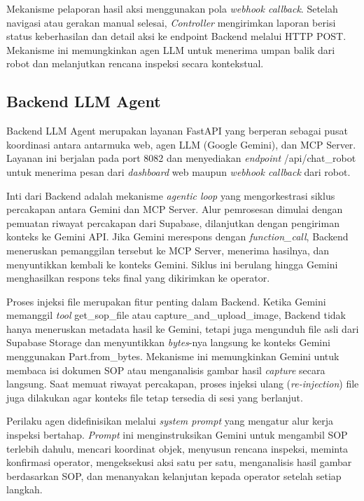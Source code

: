 Mekanisme pelaporan hasil aksi menggunakan pola \textit{webhook callback}. Setelah navigasi atau gerakan manual selesai, \textit{Controller} mengirimkan laporan berisi status keberhasilan dan detail aksi ke endpoint Backend melalui HTTP POST. Mekanisme ini memungkinkan agen LLM untuk menerima umpan balik dari robot dan melanjutkan rencana inspeksi secara kontekstual.

\subsection{Backend LLM Agent}

Backend LLM Agent merupakan layanan FastAPI yang berperan sebagai pusat koordinasi antara antarmuka web, agen LLM (Google Gemini), dan MCP Server. Layanan ini berjalan pada port 8082 dan menyediakan \textit{endpoint} /api/chat\_robot untuk menerima pesan dari \textit{dashboard} web maupun \textit{webhook callback} dari robot.

Inti dari Backend adalah mekanisme \textit{agentic loop} yang mengorkestrasi siklus percakapan antara Gemini dan MCP Server. Alur pemrosesan dimulai dengan pemuatan riwayat percakapan dari Supabase, dilanjutkan dengan pengiriman konteks ke Gemini API. Jika Gemini merespons dengan \textit{function\_call}, Backend meneruskan pemanggilan tersebut ke MCP Server, menerima hasilnya, dan menyuntikkan kembali ke konteks Gemini. Siklus ini berulang hingga Gemini menghasilkan respons teks final yang dikirimkan ke operator.

Proses injeksi file merupakan fitur penting dalam Backend. Ketika Gemini memanggil \textit{tool} get\_sop\_file atau capture\_and\_upload\_image, Backend tidak hanya meneruskan metadata hasil ke Gemini, tetapi juga mengunduh file asli dari Supabase Storage dan menyuntikkan \textit{bytes}-nya langsung ke konteks Gemini menggunakan Part.from\_bytes. Mekanisme ini memungkinkan Gemini untuk membaca isi dokumen SOP atau menganalisis gambar hasil \textit{capture} secara langsung. Saat memuat riwayat percakapan, proses injeksi ulang (\textit{re-injection}) file juga dilakukan agar konteks file tetap tersedia di sesi yang berlanjut.

Perilaku agen didefinisikan melalui \textit{system prompt} yang mengatur alur kerja inspeksi bertahap. \textit{Prompt} ini menginstruksikan Gemini untuk mengambil SOP terlebih dahulu, mencari koordinat objek, menyusun rencana inspeksi, meminta konfirmasi operator, mengeksekusi aksi satu per satu, menganalisis hasil gambar berdasarkan SOP, dan menanyakan kelanjutan kepada operator setelah setiap langkah.

